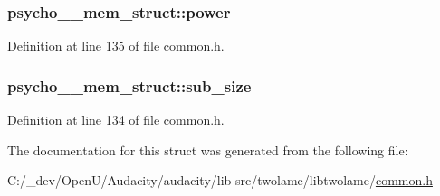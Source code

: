 \subsubsection[{\texorpdfstring{power}{power}}]{ psycho\+\_\+\_\+mem\+\_\+struct\+::power}\hypertarget{structpsycho__1__mem__struct_aaef0599267564801453f2bab3048f23f}{}\label{structpsycho__1__mem__struct_aaef0599267564801453f2bab3048f23f}


Definition at line 135 of file common.\+h.

\subsubsection[{\texorpdfstring{sub\+\_\+size}{sub_size}}]{ psycho\+\_\+\_\+mem\+\_\+struct\+::sub\+\_\+size}\hypertarget{structpsycho__1__mem__struct_a2a8a21315b257747eca8b570c91b85a5}{}\label{structpsycho__1__mem__struct_a2a8a21315b257747eca8b570c91b85a5}


Definition at line 134 of file common.\+h.



The documentation for this struct was generated from the following file\+:\begin{DoxyCompactItemize}
\item 
C\+:/\+\_\+dev/\+Open\+U/\+Audacity/audacity/lib-\/src/twolame/libtwolame/\hyperlink{twolame_2libtwolame_2common_8h}{common.\+h}\end{DoxyCompactItemize}
